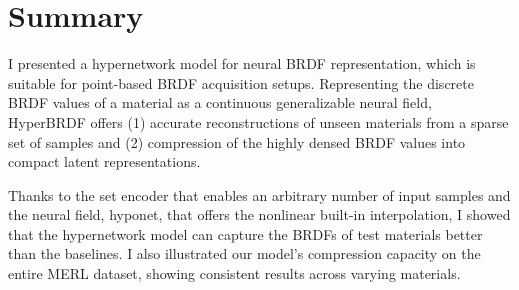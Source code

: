 \section{Summary}\label{sec:conc}

I presented a hypernetwork model for neural BRDF representation, which is suitable for point-based BRDF acquisition setups. Representing the discrete BRDF values of a material as a continuous generalizable neural field, HyperBRDF offers (1) accurate reconstructions of unseen materials from a sparse set of samples and (2) compression of the highly densed BRDF values into compact latent representations. 

Thanks to the set encoder that enables an arbitrary number of input samples and the neural field, hyponet, that offers the nonlinear built-in interpolation, I showed that the hypernetwork model can capture the BRDFs of test materials better than the baselines. I also illustrated our model's compression capacity on the entire MERL dataset, showing consistent results across varying materials.